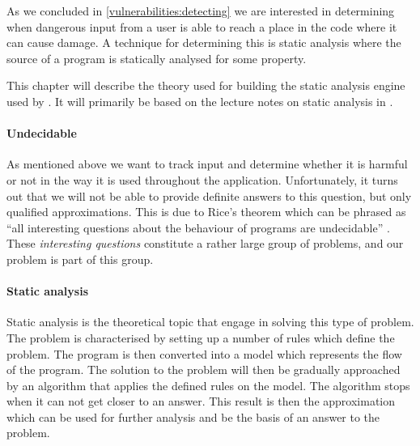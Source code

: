 As we concluded in \cref{vulnerabilities:detecting}  we are interested in determining when dangerous input from a user is able to reach a place in the code where it can cause damage.
A technique for determining this is static analysis where the source of a program is statically analysed for some property.

This chapter will describe the theory used for building the static analysis engine used by \pyt{}.
It will primarily be based on the lecture notes on static analysis in \citet{schwartzbach}.

\paragraph{Undecidable}\label{theory_intro}
As mentioned above we want to track input and determine whether it is harmful or not in the way it is used throughout the application.
Unfortunately, it turns out that we will not be able to provide definite answers to this question, but only qualified approximations.
This is due to Rice's theorem which can be phrased as ``all interesting questions about the behaviour of programs are undecidable'' \citep[p.~3]{schwartzbach}.
These \emph{interesting questions} constitute a rather large group of problems, and our problem is part of this group.

\paragraph{Static analysis}
Static analysis is the theoretical topic that engage in solving this type of problem.
The problem is characterised by setting up a number of rules which define the problem.
The program is then converted into a model which represents the flow of the program.
The solution to the problem will then be gradually approached by an algorithm that applies the defined rules on the model.
The algorithm stops when it can not get closer to an answer.
This result is then the approximation which can be used for further analysis and be the basis of an answer to the problem.

